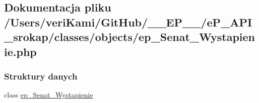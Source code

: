 \hypertarget{ep___senat___wystapienie_8php}{\subsection{Dokumentacja pliku /\-Users/veri\-Kami/\-Git\-Hub/\-\_\-\-\_\-\-E\-P\-\_\-\-\_\-/e\-P\-\_\-\-A\-P\-I\-\_\-srokap/classes/objects/ep\-\_\-\-Senat\-\_\-\-Wystapienie.php}
\label{ep___senat___wystapienie_8php}
}
\subsubsection*{Struktury danych}
\begin{DoxyCompactItemize}
\item 
class \hyperlink{classep___senat___wystapienie}{ep\-\_\-\-Senat\-\_\-\-Wystapienie}
\end{DoxyCompactItemize}
